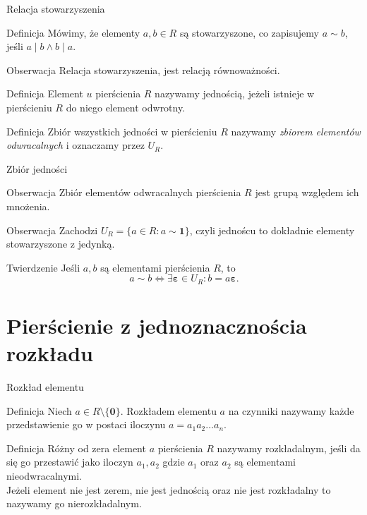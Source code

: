 \documentclass{beamer}
\newcommand{\zero}{\mathbf{0}}
\newcommand{\one}{\mathbf{1}}
\renewcommand{\epsilon}{\bm{\varepsilon}}
\begin{document}
\begin{frame}{Relacja stowarzyszenia}
    \begin{block}{Definicja}
        Mówimy, że elementy $a,b \in R$ są stowarzyszone, co zapisujemy $a \sim b$, jeśli $a \mid b \land b \mid a$. 
    \end{block}
    \begin{exampleblock}{Obserwacja}
        Relacja stowarzyszenia, jest relacją równoważności.
    \end{exampleblock}
    \pause 
    \begin{block}{Definicja}
        Element $u$ pierścienia $R$ nazywamy jednością, jeżeli istnieje w pierścieniu $R$ do niego element odwrotny.
    \end{block}
    \begin{block}{Definicja}
        Zbiór wszystkich jedności w pierścieniu $R$ nazywamy \textit{zbiorem elementów odwracalnych} i oznaczamy przez $U_R$.
    \end{block}
\end{frame}

\begin{frame}{Zbiór jedności}
    \begin{alertblock}{Obserwacja}
        Zbiór elementów odwracalnych pierścienia $R$ jest grupą względem ich mnożenia.
    \end{alertblock}
    \pause 
    \begin{alertblock}{Obserwacja}
        Zachodzi 
        $U_R = \{ a\in R : a \sim \one\}$,
        czyli jednoścu to dokładnie elementy stowarzyszone z jedynką. 
    \end{alertblock}
    \pause 
    \begin{block}{Twierdzenie}
        Jeśli $a,b$ są elementami pierścienia $R$, to 
        $$a \sim b \Leftrightarrow \exists \epsilon \in U_R : b = a \epsilon.$$
    \end{block}
\end{frame}

\section{Pierścienie z jednoznacznościa rozkładu}
\begin{frame}{Rozkład elementu}
    \begin{block}{Definicja}
        Niech $a \in R \setminus \{ \zero \}$. Rozkładem elementu $a$ na czynniki nazywamy każde przedstawienie go w postaci iloczynu $a = a_1 a_2 \ldots a_n$.
    \end{block}
    \pause 
    \begin{block}{Definicja}
        Różny od zera element $a$ pierścienia $R$ nazywamy \alert{rozkładalnym}, jeśli da  się go przestawić jako iloczyn $a_1, a_2$ gdzie $a_1$ oraz $a_2$ są elementami nieodwracalnymi. \\ 
        Jeżeli element nie jest zerem, nie jest jednością oraz nie jest rozkładalny to nazywamy go \alert{nierozkładalnym.}
    \end{block}
\end{frame}
\end{document}
